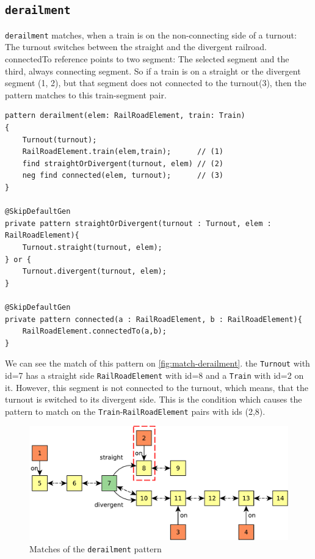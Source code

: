 \subsection{\texttt{derailment}}
\begin{minipage}{\textwidth}
	
\texttt{derailment} matches, when a train is on the non-connecting side of a turnout:
The turnout switches between the straight and the divergent railroad. 
connectedTo reference points to two segment: The selected segment and the third, always connecting segment.
So if a train is on a straight or the divergent segment (1, 2), but that segment does not connected to the turnout(3), then the pattern matches to this train-segment pair.


\begin{lstlisting}[language = vql]
pattern derailment(elem: RailRoadElement, train: Train)
{
	Turnout(turnout);
	RailRoadElement.train(elem,train); 		// (1)
	find straightOrDivergent(turnout, elem) // (2)
	neg find connected(elem, turnout); 		// (3)
}

@SkipDefaultGen
private pattern straightOrDivergent(turnout : Turnout, elem : RailRoadElement){
	Turnout.straight(turnout, elem);
} or {
	Turnout.divergent(turnout, elem);
}

@SkipDefaultGen
private pattern connected(a : RailRoadElement, b : RailRoadElement){
	RailRoadElement.connectedTo(a,b);
}

\end{lstlisting}
\end{minipage}

We can see the match of this pattern on \autoref{fig:match-derailment}. 
the \texttt{Turnout} with id=7 has a straight side \texttt{RailRoadElement} with id=8 and a \texttt{Train} with id=2 on it. However, this segment is not connected to the turnout, which means, that the turnout is switched to its divergent side.
This is the condition which causes the pattern to match on the \texttt{Train}-\texttt{RailRoadElement} pairs with ids (2,8).

\begin{figure}[H]
	\begin{center}
		\includegraphics[width=\textwidth]{figures/query-example-model-derailment.pdf}
	\end{center}
	\caption{Matches of the \texttt{derailment} pattern}
	\label{fig:match-derailment}
\end{figure}


